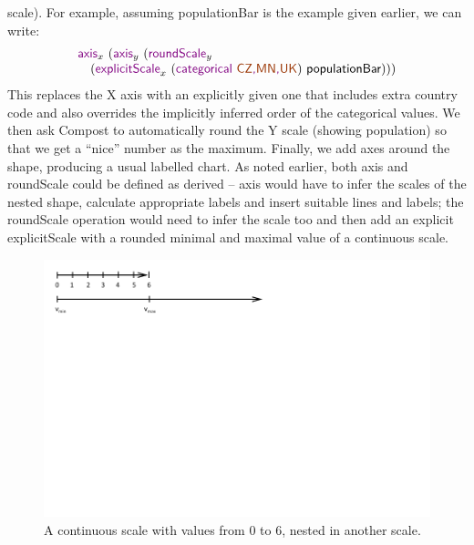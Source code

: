 \documentclass{jfp}
\newcommand{\strf}[1]{\textnormal{\textcolor{strclr}{\sffamily #1}}}
\newcommand{\ident}[1]{\textnormal{\textcolor{idclr}{\sffamily #1}}}
\newcommand{\kvd}[1]{\textnormal{\textcolor{kvdclr}{\sffamily #1}}}
\begin{document}
scale). For example, assuming \ident{populationBar} is the example given earlier, we can write:
%
\begin{equation*}
\begin{array}{l}
\kvd{axis}_x~(\kvd{axis}_y~(\kvd{roundScale}_y\\
\quad(\kvd{explicitScale}_x~(\kvd{categorical \strf{CZ},\strf{MN},\strf{UK}})~\ident{populationBar})))
\end{array}
\end{equation*}
%
This replaces the X axis with an explicitly given one that includes extra country code and also
overrides the implicitly inferred order of the categorical values. We then ask Compost to
automatically round the Y scale (showing population) so that we get a ``nice'' number as the
maximum. Finally, we add axes around the shape, producing a usual labelled chart.
As noted earlier, both \kvd{axis} and \kvd{roundScale} could be defined as derived -- \kvd{axis}
would have to infer the scales of the nested shape, calculate appropriate labels and insert
suitable lines and labels; the \kvd{roundScale} operation would need to infer the scale too and
then add an explicit \kvd{explicitScale} with a rounded minimal and maximal value of a continuous
scale.
\begin{figure}[!h]
\includegraphics[scale=1,trim={0cm 7.5cm 6cm 0cm},clip]{nest.pdf}
\caption{A continuous scale with values from $0$ to $6$, nested in another scale.}
\label{fig:nesting}
\end{figure}
\end{document}
